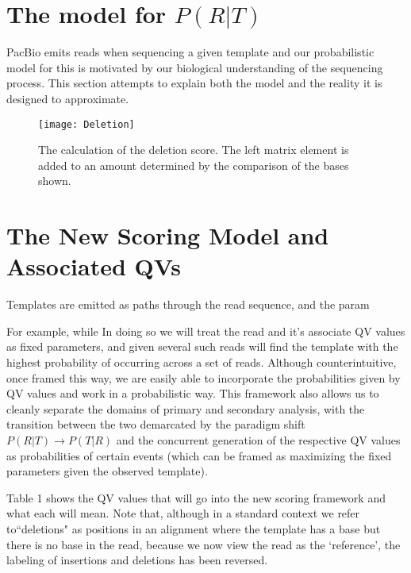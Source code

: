 \documentclass[fleqn,10pt]{SelfArx} %
\begin{document}
\section{The model for $P(R|T)$}

PacBio emits reads when sequencing a given template and our probabilistic model for this is motivated by our biological understanding of the sequencing process.  This section attempts to explain both the model and the reality it is designed to approximate.

\begin{figure}[ht] %
	\texttt{[image: Deletion]}
		\caption{The calculation of the deletion score.  The left matrix element is added to an amount determined by the comparison of the bases shown.}				
\end{figure}

 



\section{The New Scoring Model and Associated QVs}

  Templates are emitted as paths through the read sequence, and the param

  For example, while 
In doing so we will treat the read and it's associate QV values as fixed parameters, and given several such reads will find the template with the highest probability of occurring across a set of reads.  Although counterintuitive, once framed this way, we are easily able to incorporate the probabilities given by QV values and work in a probabilistic way.  This framework also allows us to cleanly separate the domains of primary and secondary analysis, with the transition between the two demarcated by the paradigm shift  $P(R|T) \rightarrow P(T|R) $ and the concurrent generation of the respective QV values as probabilities of certain events (which can be framed as maximizing the fixed parameters given the observed template). 


Table 1 shows the QV values that will go into the new scoring framework and what each will mean.  Note that, although in a standard context we refer to``deletions" as positions in an alignment where the template has a base but there is no base in the read, because we now view the read as the `reference', the labeling of insertions and deletions has been reversed.
\end{document}
